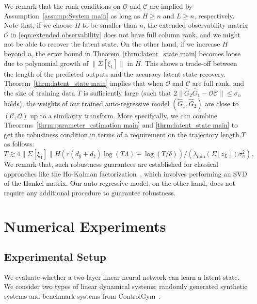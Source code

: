 \documentclass[11pt]{article}
\renewcommand{\cite}{\citep}
\newcommand{\Ccal}{\mathcal{C}}
\newcommand{\Ocal}{\mathcal{O}}
\newcommand{\norm}[1]{\|{#1} \|}
\newcommand{\<}{\langle}
\renewcommand{\>}{\rangle}
\numberwithin{equation}{section}
\begin{document}
We remark that the rank conditions on $\Ocal$ and $\Ccal$ are implied by Assumption~\ref{assump:System main} as long as $H\geq n$ and $L\geq n$, respectively. Note that, if we choose $H$ to be smaller than $n$, the extended observability matrix $\Ocal$ in \eqref{eqn:extended observability} does not have full column rank, and we might not be able to recover the latent state. On the other hand, if we increase $H$ beyond $n$, the error bound in Theorem~\ref{thrm:latent_state main} becomes loose due to polynomial growth of $\norm{\Sigma[\xi_1]}$ in $H$. This shows a trade-off between the length of the predicted outputs and the accuracy latent state recovery. Theorem~\ref{thrm:latent_state main} implies that when $\Ocal$ and $\Ccal$ are full rank, and the size of training data $T$ is sufficiently large (such that $2\norm{\hat{G}_2 \hat{G}_1 - \Ocal \Ccal}\leq \sigma_n$ holds), the weights of our trained auto-regressive model $(\hat{G}_1, \hat{G}_2)$ are close to $(\Ccal, \Ocal)$ up to a similarity transform. More specifically, we can combine Theorems~\ref{thrm:parameter_estimation main} and \ref{thrm:latent_state main} to get the robustness condition in terms of a requirement on the trajectory length $T$ as follows: 
$
T \gtrsim {4 \|\Sigma[\xi_1]\| H (r (d_{\bar{y}} + d_{\bar{z}}) \log(T \Lambda) + \log(T/\delta) )}/({\lambda_{\min}(\Sigma[\bar{z}_L]) \sigma_{n}^2}). 
$ 
We remark that, such robustness guarantees are established for classical approaches like the Ho-Kalman factorization~\cite{oymak2018non}, which involves performing an SVD of the Hankel matrix. Our auto-regressive model, on the other hand, does not require any additional procedure to guarantee robustness. 


%
\section{Numerical Experiments} \label{sec:experiments}

\subsection{Experimental Setup} \label{subsec:experimental-setup}

We evaluate whether a two-layer linear neural network can learn a latent state. We consider two types of linear dynamical systems: randomly generated synthetic systems and benchmark systems from ControlGym~\cite{zhang2024controlgym}.
\end{document}

